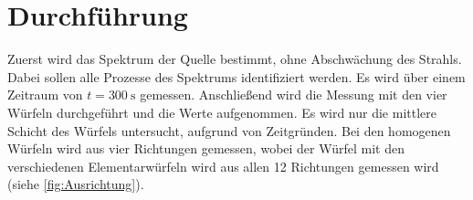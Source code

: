 \section{Durchführung}
\label{sec:Durchführung}
Zuerst wird das Spektrum der Quelle bestimmt, ohne Abschwächung des Strahls. Dabei sollen alle Prozesse des Spektrums identifiziert werden.
Es wird über einem Zeitraum  von $t = \qty{300}{\second}$ gemessen.
Anschließend wird die Messung mit den vier Würfeln durchgeführt und die Werte aufgenommen.
Es wird nur die mittlere Schicht des Würfels untersucht, aufgrund von Zeitgründen.  Bei den homogenen Würfeln wird aus vier Richtungen gemessen, wobei der Würfel mit den verschiedenen 
Elementarwürfeln wird aus allen 12 Richtungen gemessen wird (siehe \autoref{fig:Ausrichtung}).